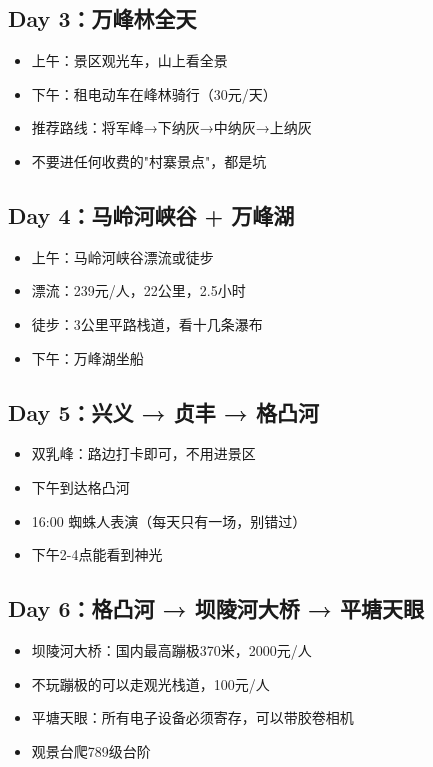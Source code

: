 \documentclass[12pt,a4paper,UTF8]{ctexart}
\begin{document}
\subsection{Day 3：万峰林全天}
\begin{itemize}
\item 上午：景区观光车，山上看全景
\item 下午：租电动车在峰林骑行（30元/天）
\item 推荐路线：将军峰→下纳灰→中纳灰→上纳灰
\item 不要进任何收费的"村寨景点"，都是坑
\end{itemize}

\subsection{Day 4：马岭河峡谷 + 万峰湖}
\begin{itemize}
\item 上午：马岭河峡谷漂流或徒步
\item 漂流：239元/人，22公里，2.5小时
\item 徒步：3公里平路栈道，看十几条瀑布
\item 下午：万峰湖坐船
\end{itemize}

\subsection{Day 5：兴义 → 贞丰 → 格凸河}
\begin{itemize}
\item 双乳峰：路边打卡即可，不用进景区
\item 下午到达格凸河
\item 16:00 蜘蛛人表演（每天只有一场，别错过）
\item 下午2-4点能看到神光
\end{itemize}

\subsection{Day 6：格凸河 → 坝陵河大桥 → 平塘天眼}
\begin{itemize}
\item 坝陵河大桥：国内最高蹦极370米，2000元/人
\item 不玩蹦极的可以走观光栈道，100元/人
\item 平塘天眼：所有电子设备必须寄存，可以带胶卷相机
\item 观景台爬789级台阶
\end{itemize}
\end{document}

